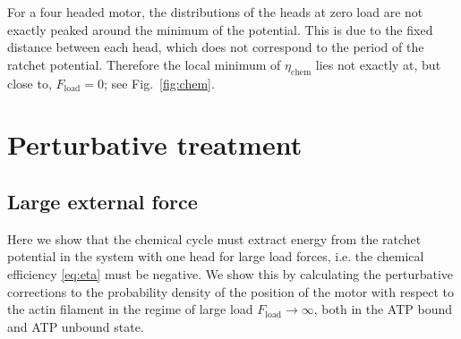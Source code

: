 \documentclass[aps,pre,twocolumn,showpacs,showkeys,superscriptaddress,floatfix]{revtex4-1}
\begin{document}
For a four headed motor, the distributions of the heads at zero load are not exactly peaked around the minimum of the potential. 
This is due to the fixed distance between each head, which does not correspond to the period of the ratchet potential. 
Therefore the local minimum of $\eta_\text{chem}$ lies not exactly at, but close to, $F_\text{load} =0$; see Fig.~\ref{fig:chem}.



\section{Perturbative treatment}
\label{sec:perturb}
\subsection{Large external force}
Here we show that the chemical cycle must extract energy from the ratchet potential in the system with one head for large load forces, 
i.e. the chemical efficiency \eqref{eq:eta} must be negative. 
We show this by calculating the perturbative corrections to the probability density of the position of the motor with respect to the actin filament in the regime of large load $F_\text{load} \to \infty$, both in the ATP bound and ATP unbound state. 
\end{document}
